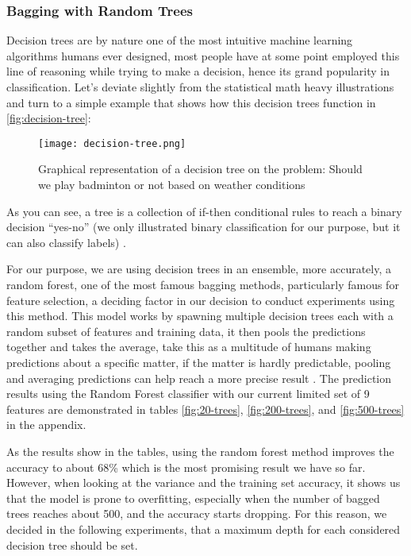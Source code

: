 \subsubsection{Bagging with Random Trees}
Decision trees are by nature one of the most intuitive machine learning algorithms humans ever designed, most people have at some point employed this line of reasoning while trying to make a decision, hence its grand popularity in classification.
Let’s deviate slightly from the statistical math heavy illustrations and turn to a simple example that shows how this decision trees function in
\autoref{fig:decision-tree}:

\begin{figure}[h]
  \centering
  \texttt{[image: decision-tree.png]}
  \caption{Graphical representation of a decision tree on the problem: Should we play badminton or not based on weather conditions}
  \label{fig:decision-tree}
\end{figure}

As you can see, a tree is a collection of if-then conditional rules to reach a binary decision “yes-no” (we only illustrated  binary classification
for our purpose, but it can also classify labels) \cite{6}.

For our purpose, we are using decision trees in an ensemble, more accurately, a random forest, one of the most famous bagging methods, particularly famous for feature selection, a deciding factor in our decision to conduct experiments using this method.
This model works by spawning multiple decision trees each with a random subset of features and training data, it then pools the predictions together
and takes the average, take this as a multitude of humans making predictions about a specific matter, if the matter is hardly predictable, pooling and
averaging predictions can help reach a more precise result \cite{10}.
The prediction results using the Random Forest classifier with our current limited set of 9 features are demonstrated in tables
\autoref{fig:20-trees}, \autoref{fig:200-trees}, and \autoref{fig:500-trees} in the appendix.

As the results show in the tables, using the random forest method improves the accuracy to about 68\% which is the most promising result we have so far.
However, when looking at the variance and the training set accuracy, it shows us that the model is prone to overfitting, especially when the number of bagged trees reaches about 500, and the accuracy starts dropping.
For this reason, we decided in the following experiments, that a maximum depth for each considered decision tree should be set.


